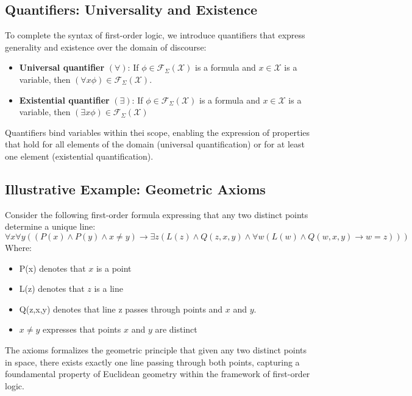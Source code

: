 \documentclass[a4paper]{article}
\theoremstyle{definition}
\begin{document}
\subsection{Quantifiers: Universality and Existence}
To complete the syntax of first-order logic, we introduce quantifiers that express generality 
and existence over the domain of discourse:
\begin{itemize}
	\item \textbf{Universal quantifier} \( (\forall) \): If \( \phi \in \mathcal{F}_{\Sigma} (\mathcal{X}) \) is a formula and \( x \in \mathcal{X} \) is a variable, then 
		\( (\forall x \phi) \in \mathcal{F}_{\Sigma} (\mathcal{X}) \).
	\item \textbf{Existential quantifier} \( (\exists) \): If \( \phi \in \mathcal{F}_{\Sigma} (\mathcal{X}) \) is a formula and \( x \in \mathcal{X} \) is a variable, then 
		\( (\exists x \phi) \in \mathcal{F}_{\Sigma} (\mathcal{X}) \)
\end{itemize}
Quantifiers bind variables within thei scope, enabling the expression of properties that hold 
for all elements of the domain (universal quantification) or for at least one element (existential quantification).
\subsection{Illustrative Example: Geometric Axioms}
Consider the following first-order formula expressing that any two distinct points determine a unique line:
\[
  \forall x \forall y ((P(x) \wedge P(y) \wedge x \neq y) \rightarrow \exists z (L(z) \wedge Q(z,x,y) \wedge \forall w (L(w) \wedge Q(w,x,y) \rightarrow w = z)))
\]
Where:
\begin{itemize}
	\item P(x) denotes that \( x \) is a point 
	\item L(z) denotes that \( z \) is a line 
	\item Q(z,x,y) denotes that line z passes through points and \( x \) and \( y \).
	\item \( x \neq y \) expresses that points \( x \) and \( y \) are distinct
\end{itemize}
The axioms formalizes the geometric principle that given any two distinct points in space, there 
exists exactly one line passing through both points, capturing a foundamental property of Euclidean geometry within the 
framework of first-order logic.
\end{document}
